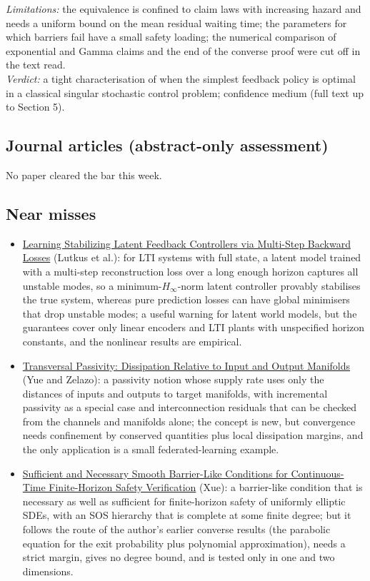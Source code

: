 \documentclass[11pt,a4paper]{article}
\begin{document}
\begin{enumerate}[leftmargin=*]
  \emph{Limitations:} the equivalence is confined to claim laws with increasing hazard and needs a uniform bound on the mean residual waiting time; the parameters for which barriers fail have a small safety loading; the numerical comparison of exponential and Gamma claims and the end of the converse proof were cut off in the text read.\\
  \emph{Verdict:} a tight characterisation of when the simplest feedback policy is optimal in a classical singular stochastic control problem; confidence medium (full text up to Section 5).
\end{enumerate}

\subsection*{Journal articles (abstract-only assessment)}
No paper cleared the bar this week.

\subsection*{Near misses}
\begin{itemize}[leftmargin=*]
  \item \href{https://arxiv.org/abs/2610.40931}{Learning Stabilizing Latent Feedback Controllers via Multi-Step Backward Losses} (Lutkus et al.): for \ac{LTI} systems with full state, a latent model trained with a multi-step reconstruction loss over a long enough horizon captures all unstable modes, so a minimum-$H_\infty$-norm latent controller provably stabilises the true system, whereas pure prediction losses can have global minimisers that drop unstable modes; a useful warning for latent world models, but the guarantees cover only linear encoders and \ac{LTI} plants with unspecified horizon constants, and the nonlinear results are empirical.
  \item \href{https://arxiv.org/abs/2611.06251}{Transversal Passivity: Dissipation Relative to Input and Output Manifolds} (Yue and Zelazo): a passivity notion whose supply rate uses only the distances of inputs and outputs to target manifolds, with incremental passivity as a special case and interconnection residuals that can be checked from the channels and manifolds alone; the concept is new, but convergence needs confinement by conserved quantities plus local dissipation margins, and the only application is a small federated-learning example.
  \item \href{https://arxiv.org/abs/2611.04888}{Sufficient and Necessary Smooth Barrier-Like Conditions for Continuous-Time Finite-Horizon Safety Verification} (Xue): a barrier-like condition that is necessary as well as sufficient for finite-horizon safety of uniformly elliptic \acp{SDE}, with an \ac{SOS} hierarchy that is complete at some finite degree; but it follows the route of the author's earlier converse results (the parabolic equation for the exit probability plus polynomial approximation), needs a strict margin, gives no degree bound, and is tested only in one and two dimensions.
\end{itemize}
\end{document}
